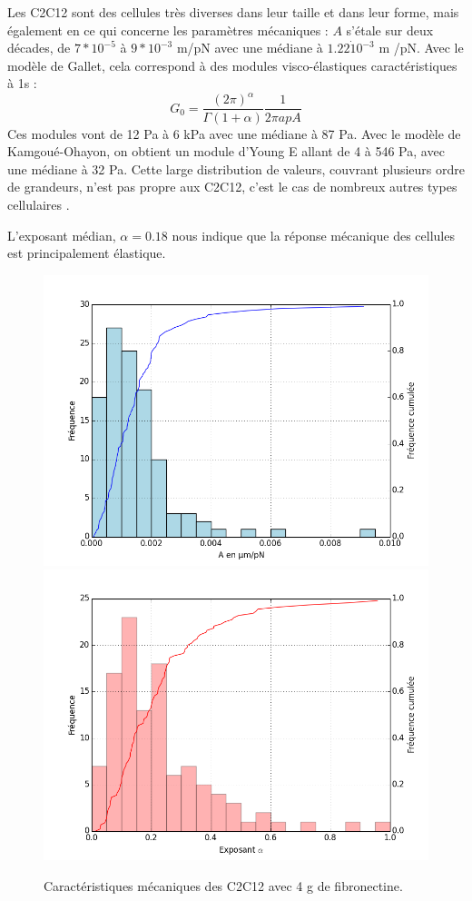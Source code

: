 Les C2C12 sont des cellules très diverses dans leur taille et dans leur forme, mais également en ce qui concerne les paramètres mécaniques : $A$ s'étale sur deux décades, de $7*10^{-5}$ à $9* 10^{-3}$ \micro m/pN avec une médiane à $1.22 \dot 10^{-3}$ \micro m /pN.  Avec le modèle de Gallet, cela correspond à des modules visco-élastiques caractéristiques à 1s : 
$$G_0 = \frac{(2 \pi)^{\alpha}}{\Gamma(1+\alpha)} \frac{1}{2 \pi a p A}$$ 
Ces modules vont de 12 Pa à 6 kPa avec une médiane à 87 Pa. 
Avec le modèle de Kamgoué-Ohayon, on obtient un module d'Young E allant de 4 à 546 Pa, avec une médiane à 32 Pa. Cette large distribution de valeurs, couvrant plusieurs ordre de grandeurs, n'est pas propre aux C2C12, c'est le cas de nombreux autres types cellulaires \parencite{balland_dissipative_2005}. 

L'exposant médian, $\alpha=0.18$ nous indique que la réponse mécanique des cellules est principalement élastique.


\begin{figure}
\includegraphics[scale=0.5]{Figures/A0_Toutes.png} 
\includegraphics[scale=0.5]{Figures/E0_Toutes.png} 
\caption{Caractéristiques mécaniques des C2C12 avec 4 \micro g de fibronectine.}
\end{figure}
 
